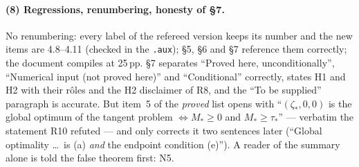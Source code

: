 \documentclass[11pt]{article}
\begin{document}
\paragraph{(8) Regressions, renumbering, honesty of \S7.}  No renumbering: every label of
the refereed version keeps its number and the new items are 4.8--4.11 (checked in the
\texttt{.aux}); \S5, \S6 and \S7 reference them correctly; the document compiles at 25\,pp.
\S7 separates ``Proved here, unconditionally'', ``Numerical input (not proved here)'' and
``Conditional'' correctly, states H1 and H2 with their r\^oles and the H2 disclaimer of R8,
and the ``To be supplied'' paragraph is accurate.  But item~5 of the \emph{proved} list
opens with ``$(\zeta_*,0,0)$ is the global optimum of the tangent problem
$\iff M_*\ge0$ and $M_*\ge\tau_*$'' --- verbatim the statement R10 refuted --- and only
corrects it two sentences later (``Global optimality \dots\ is (a) \emph{and} the endpoint
condition (e)'').  A reader of the summary alone is told the false theorem first: N5.
\end{document}
